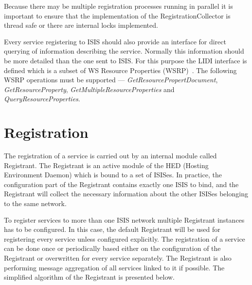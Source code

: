 \documentclass{book}
\begin{document}
Because there may be multiple registration processes running in parallel it is important to ensure that the
implementation of the RegistrationCollector is thread safe or there are internal locks implemented.

Every service registering to ISIS should also provide an interface for direct querying of information 
describing the service. Normally this information should be more detailed than the one sent to ISIS. For this 
purpose the LIDI interface is defined which is a subset of WS Resource Properties (WSRP)~\cite{wsrf-rp}. The following WSRP
operations must be supported --- \textit{GetResourcePropertDocument}, \textit{GetResourceProperty},
\textit{GetMultipleResourceProperties} and \textit{QueryResourceProperties}.




\section{Registration}
\label{sec:service_registration}

The registration of a service is carried out by an internal module called Registrant. The Registrant is an active module of the HED (Hosting Environment Daemon) which is bound to a set of ISISes. In practice, the configuration part of the Registrant contains exactly one ISIS to bind, and the Registrant will collect the necessary information about the other ISISes belonging to the same network.

To register services to more than one ISIS network multiple Registrant instances has to be configured. In this case, the default Registrant will be used for registering every service unless configured explicitly.
The registration of a service can be done once or periodically based either on the configuration of the Registrant or overwritten for every service separately. The Registrant is also performing message aggregation of all services linked to it if possible. The simplified algorithm of the Registrant is presented below.
\end{document}
